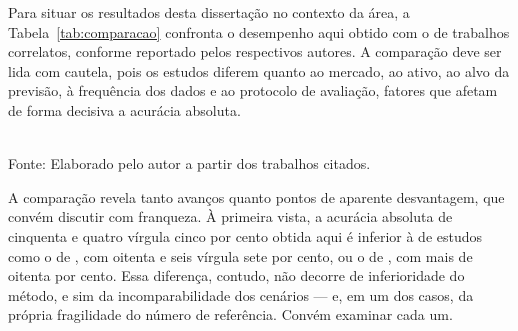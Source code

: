 Para situar os resultados desta dissertação no contexto da área, a Tabela~\ref{tab:comparacao} confronta o desempenho aqui obtido com o de trabalhos correlatos, conforme reportado pelos respectivos autores. A comparação deve ser lida com cautela, pois os estudos diferem quanto ao mercado, ao ativo, ao alvo da previsão, à frequência dos dados e ao protocolo de avaliação, fatores que afetam de forma decisiva a acurácia absoluta.

\begin{table}[htpb]
\centering
\caption{Comparação do desempenho desta dissertação com o de trabalhos correlatos, conforme reportado pelos autores.}
\label{tab:comparacao}
\vspace{0.2cm}
{\small \\ Fonte: Elaborado pelo autor a partir dos trabalhos citados.}
\end{table}

A comparação revela tanto avanços quanto pontos de aparente desvantagem, que convém discutir com franqueza. À primeira vista, a acurácia absoluta de cinquenta e quatro vírgula cinco por cento obtida aqui é inferior à de estudos como o de , com oitenta e seis vírgula sete por cento, ou o de , com mais de oitenta por cento. Essa diferença, contudo, não decorre de inferioridade do método, e sim da incomparabilidade dos cenários --- e, em um dos casos, da própria fragilidade do número de referência. Convém examinar cada um.

